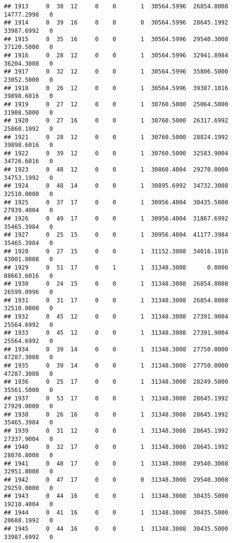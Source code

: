 \documentclass[
]{article}
\begin{document}
\begin{enumerate}
\begin{verbatim}
## 1913     0  30  12     0    0       1  30564.5996  26854.8008  14777.2998   0
## 1914     0  39  16     0    0       0  30564.5996  28645.1992  33987.6992   0
## 1915     0  35  16     0    0       1  30564.5996  29540.3008  37120.5000   0
## 1916     0  28  12     0    0       1  30564.5996  32941.8984  36204.3008   0
## 1917     0  32  12     0    0       1  30564.5996  35806.5000  23052.5000   0
## 1918     0  26  12     0    0       1  30564.5996  39387.1016  39898.6016   0
## 1919     0  27  12     0    0       1  30760.5000  25064.5000  31908.5000   0
## 1920     0  27  16     0    0       1  30760.5000  26317.6992  25860.1992   0
## 1921     0  28  12     0    0       1  30760.5000  28824.1992  39898.6016   0
## 1922     0  39  12     0    0       1  30760.5000  32583.9004  34726.6016   0
## 1923     0  48  12     0    0       1  30860.4004  29270.0000  34753.1992   0
## 1924     0  48  14     0    0       1  30895.6992  34732.3008  32510.0000   0
## 1925     0  37  17     0    0       1  30956.4004  30435.5000  27939.4004   0
## 1926     0  49  17     0    0       1  30956.4004  31867.6992  35465.3984   0
## 1927     0  25  15     0    0       1  30956.4004  41177.3984  35465.3984   0
## 1928     0  27  15     0    0       1  31152.3008  34016.1016  43001.8008   0
## 1929     0  51  17     0    1       1  31348.3008      0.0000  88663.6016   0
## 1930     0  24  15     0    0       1  31348.3008  26854.8008  26599.0996   0
## 1931     0  31  17     0    0       1  31348.3008  26854.8008  32510.0000   0
## 1932     0  45  12     0    0       1  31348.3008  27391.9004  25564.6992   0
## 1933     0  45  12     0    0       1  31348.3008  27391.9004  25564.6992   0
## 1934     0  39  14     0    0       1  31348.3008  27750.0000  47287.3008   0
## 1935     0  39  14     0    0       1  31348.3008  27750.0000  47287.3008   0
## 1936     0  25  17     0    0       1  31348.3008  28249.5000  35561.5000   0
## 1937     0  53  17     0    0       1  31348.3008  28645.1992  27929.0000   0
## 1938     0  26  16     0    0       1  31348.3008  28645.1992  35465.3984   0
## 1939     0  31  12     0    0       1  31348.3008  28645.1992  27337.9004   0
## 1940     0  32  17     0    0       1  31348.3008  28645.1992  28076.8008   0
## 1941     0  48  17     0    0       1  31348.3008  29540.3008  32951.8008   0
## 1942     0  47  17     0    0       0  31348.3008  29540.3008  29259.0000   0
## 1943     0  44  16     0    0       1  31348.3008  30435.5000  19210.4004   0
## 1944     0  41  16     0    0       1  31348.3008  30435.5000  20688.1992   0
## 1945     0  44  16     0    0       1  31348.3008  30435.5000  33987.6992   0

\end{verbatim}
\end{enumerate}
\end{document}

